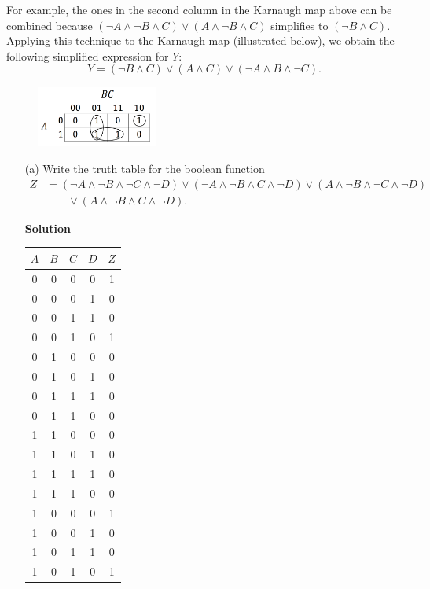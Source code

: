 \documentclass{article}\usepackage{amsmath,amssymb,amsthm,tikz,tkz-graph,color,chngpage,soul,hyperref,csquotes,graphicx,floatrow}\newcommand*{\QEDB}{\hfill\ensuremath{\square}}\newtheorem*{prop}{Proposition}\usepackage[shortlabels]{enumitem}\usepackage[nobreak=true]{mdframed}\usetikzlibrary{matrix,calc}\MakeOuterQuote{"}\usepackage[margin=1in]{geometry} \newtheorem{theorem}{Theorem} \usepackage{circuitikz}
\begin{document}
\begin{enumerate}
For example, the ones in the second column in the Karnaugh map above can be combined because $(\lnot A \land \lnot B \land C)\lor (A \land \lnot B \land C)$ simplifies to $(\lnot B \land C)$. Applying this technique to the Karnaugh map (illustrated below), we obtain the following simplified expression for $Y$:
\begin{equation*}
Y = (\lnot B \land C) \lor (A \land C) \lor (\lnot A \land B \land \lnot C).
\end{equation*}
%
\begin{figure}[htp]
\begin{center}
\includegraphics[width=4cm]{kmap2}
\end{center}
\end{figure}
%

\begin{enumerate}
\item[(a)] Write the truth table for the boolean function
\begin{align*}
    Z &= (\lnot A \land \lnot B \land \lnot C \land \lnot D) \lor (\lnot A \land \lnot B \land C \land \lnot D) \lor (A \land \lnot B \land \lnot C \land \lnot D) \\
      &\qquad \lor (A \land \lnot B \land C \land \lnot D).
\end{align*} 
\begin{mdframed} \textbf{Solution} \\
\begin{center}
\begin{tabular}{ c | c | c | c || c }
$A$ & $B$ & $C$ & $D$ & $Z$\\
\hline
0 & 0 & 0 & 0 & 1\\
0 & 0 & 0 & 1 & 0\\
0 & 0 & 1 & 1 & 0\\
0 & 0 & 1 & 0 & 1\\
0 & 1 & 0 & 0 & 0\\
0 & 1 & 0 & 1 & 0\\
0 & 1 & 1 & 1 & 0\\
0 & 1 & 1 & 0 & 0\\
1 & 1 & 0 & 0 & 0\\
1 & 1 & 0 & 1 & 0\\
1 & 1 & 1 & 1 & 0\\
1 & 1 & 1 & 0 & 0\\
1 & 0 & 0 & 0 & 1\\
1 & 0 & 0 & 1 & 0\\
1 & 0 & 1 & 1 & 0\\
1 & 0 & 1 & 0 & 1\\


\end{tabular}
\end{center}
\end{mdframed}
\end{enumerate}
\end{enumerate}
\end{document}
